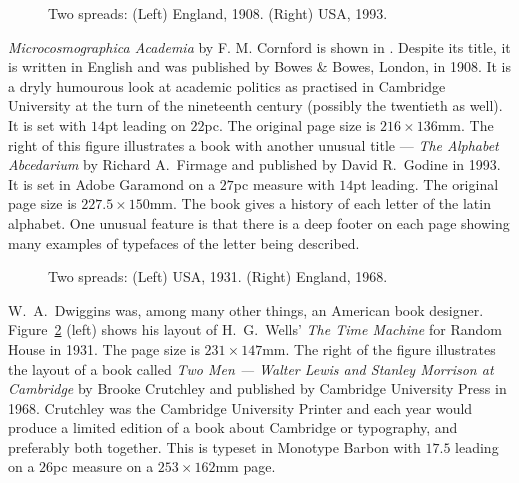 \documentclass[10pt,letterpaper]{memoir}
\newlength{\pwlayi}\setlength{\pwlayi}{0.45\textwidth} %
\newlength{\pwlayii}\setlength{\pwlayii}{0.45\pwlayi}
\begin{document}
\begin{figure}
\centering
\begin{minipage}[b]{\pwlayi}
\end{minipage}
\hfill
\begin{minipage}[b]{\pwlayi}
\end{minipage}
\caption[Two spreads: England, 1908 and USA, 1993]%
        {Two spreads: (Left) England, 1908.
         (Right) USA, 1993.} \label{fb:5}
\end{figure}

    \textit{Microcosmographica Academia} by F. M. Cornford is shown in
. Despite its title, it is written in English and was published
by Bowes \& Bowes, London, in 1908. It is a dryly humourous look at academic
politics as practised in Cambridge University at the turn of the nineteenth
century (possibly the twentieth as well). It is set with $14$pt leading
on $22$pc. The original page size is $216 \times 136$mm.
The right of this figure illustrates a book with another unusual title ---
\textit{The Alphabet Abcedarium} by Richard A.~Firmage  and published by
David R.~Godine in  1993. It is set in Adobe Garamond on a $27$pc measure
with $14$pt leading. The original page size is $227.5 \times 150$mm. The
book gives a history of each letter of the latin alphabet. One
unusual feature is that there is a deep footer on each page
showing many examples of typefaces of the letter being described.


\begin{figure}
\centering
\begin{minipage}[b]{\pwlayi}
\end{minipage}
\hfill
\begin{minipage}[b]{\pwlayi}
\end{minipage}
\caption[Two spreads: USA, 1931 and England, 1968]%
        {Two spreads: (Left) USA, 1931.
         (Right) England, 1968.} \label{fb:6}
\end{figure}


    W.~A.~Dwiggins was, among many other things, an American book designer.
Figure~\ref{fb:6} (left) shows his layout of H.~G.~Wells' \textit{The Time
Machine} for Random House in 1931. The page size is $231 \times 147$mm.
The right of the figure illustrates the layout of a book called 
\textit{Two Men --- Walter Lewis and Stanley Morrison at Cambridge}
by Brooke Crutchley and published by Cambridge University Press in 1968.
Crutchley was the Cambridge University Printer and each year would produce
a limited edition of a book about Cambridge or typography, and preferably
both together. This is typeset in Monotype Barbon with $17.5$ leading on
a $26$pc measure on a $253 \times 162$mm page.
\end{document}
